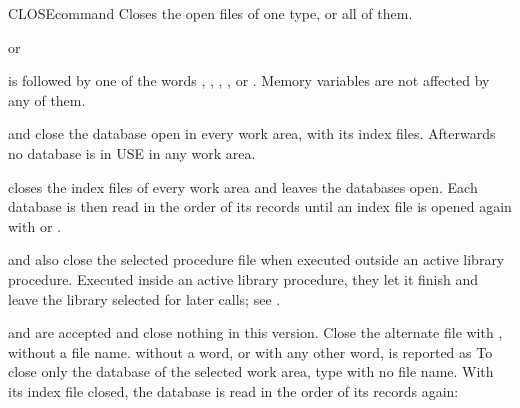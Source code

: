 \begin{XbaseEntry}{CLOSE}{command}
Closes the open files of one type, or all of them.
\Syntax
{}
\par or\par
{}
\Usage
{} is followed by one of the words , ,
, ,  or .  Memory variables
are not affected by any of them.

 and  close the database open in every
work area, with its index files.  Afterwards no database is in USE in any
work area.

 closes the index files of every work area and leaves the
databases open.  Each database is then read in the order of its records
until an index file is opened again with  or .

 and  also close the selected procedure
file when executed outside an active library procedure.  Executed inside
an active library procedure, they let it finish and leave the library
selected for later calls; see .

 and  are
accepted and close nothing in this version.  Close the alternate file with
, without a file name.   without a word, or with any other word,
is reported as 
\Tips
To close only the database of the selected work area, type  with no
file name.
\Examples
{}
With its index file closed, the database is read in the order of its
records again:
\end{XbaseEntry}

